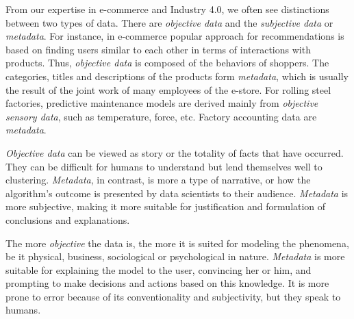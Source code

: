 \documentclass{article}
\begin{document}
From our expertise in e-commerce and Industry 4.0, we often see distinctions between two types of data.
There are \textit{objective data} and the \textit{subjective data} or \textit{metadata}.
For instance, in e-commerce popular approach for recommendations is based on finding users similar to each other in terms of interactions with products.
Thus, \textit{objective data} is composed of the behaviors of shoppers.
The categories, titles and descriptions of the products form \textit{metadata}, which is usually the result of the joint work of many employees of the e-store.
For rolling steel factories, predictive maintenance models are derived mainly from \textit{objective sensory data}, such as temperature, force, etc.
Factory accounting data are \textit{metadata}.

\textit{Objective data} can be viewed as story or the totality of facts that have occurred.
They can be difficult for humans to understand but lend themselves well to clustering.
\textit{Metadata}, in contrast, is more a type of narrative, or how the algorithm's outcome is presented by data scientists to their audience.
\textit{Metadata} is more subjective, making it more suitable for justification and formulation of conclusions and explanations.

The more \textit{objective} the data is, the more it is suited for modeling the phenomena, be it physical, business, sociological or psychological in nature.
\textit{Metadata} is more suitable for explaining the model to the user, convincing her or him, and prompting to make decisions and actions based on this knowledge.
It is more prone to error because of its conventionality and subjectivity, but they speak to humans.
\end{document}
